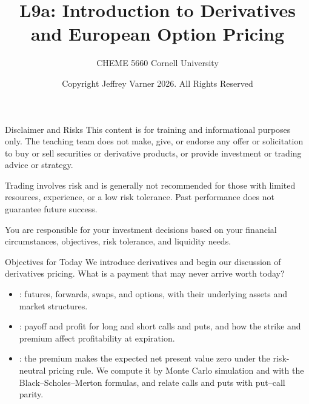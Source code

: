 \documentclass[aspectratio=169,11pt]{beamer}
\title{\texorpdfstring{{\vnheavy L9a}}{L9a}: Introduction to Derivatives and European Option Pricing}
\subtitle{CHEME 5660 Cornell University}
\author{Copyright Jeffrey Varner 2026. All Rights Reserved}
\begin{document}
\vntitlepage

\begin{frame}{Disclaimer and Risks}
  \vspace{0.6em}
  \textbf{} This content is for training and informational
  purposes only. The teaching team does not make, give, or endorse any offer or
  solicitation to buy or sell securities or derivative products, or provide
  investment or trading advice or strategy.

  \vspace{1.1em}
  \textbf{} Trading involves risk and is generally not recommended for
  those with limited resources, experience, or a low risk tolerance. Past
  performance does not guarantee future success.

  \vspace{1.1em}
  \textbf{} You are responsible for your investment decisions
  based on your financial circumstances, objectives, risk tolerance, and
  liquidity needs.
\end{frame}

\begin{frame}{Objectives for Today}
  We introduce derivatives and begin our discussion of derivatives pricing.
  What is a payment that may never arrive worth today?

  \vspace{0.5em}
  {\large\textbf{}}
  \begin{itemize}\setlength{\itemsep}{0.4em}
    \item {}: futures, forwards, swaps,
      and options, with their underlying assets and market structures.
    \item {}: payoff and profit for
      long and short calls and puts, and how the strike and premium affect
      profitability at expiration.
    \item {}: the premium makes the
      expected net present value zero under the risk-neutral pricing rule. We
      compute it by Monte Carlo simulation and with the Black--Scholes--Merton
      formulas, and relate calls and puts with put--call parity.
  \end{itemize}
\end{frame}
\end{document}
